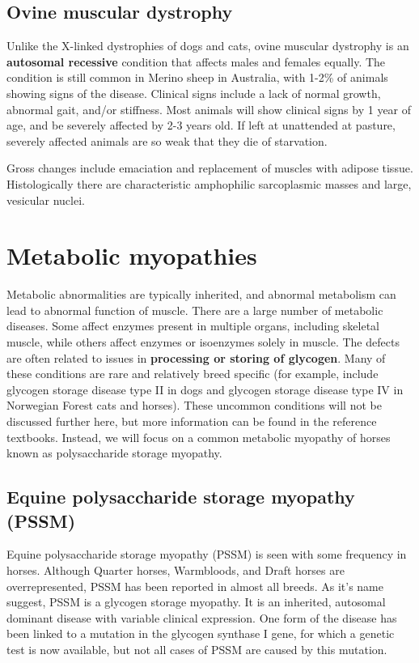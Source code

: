 \documentclass[openany]{report}
\begin{document}
\subsection{Ovine muscular dystrophy}\label{ovine-muscular-dystrophy}

Unlike the X-linked dystrophies of dogs and cats, ovine muscular
dystrophy is an \textbf{autosomal recessive} condition that affects
males and females equally. The condition is still common in Merino sheep
in Australia, with 1-2\% of animals showing signs of the disease.
Clinical signs include a lack of normal growth, abnormal gait, and/or
stiffness. Most animals will show clinical signs by 1 year of age, and
be severely affected by 2-3 years old. If left at unattended at pasture,
severely affected animals are so weak that they die of starvation.

Gross changes include emaciation and replacement of muscles with adipose
tissue. Histologically there are characteristic amphophilic sarcoplasmic
masses and large, vesicular nuclei.

\section{Metabolic myopathies}\label{metabolic-myopathies}

Metabolic abnormalities are typically inherited, and abnormal metabolism
can lead to abnormal function of muscle. There are a large number of
metabolic diseases. Some affect enzymes present in multiple organs,
including skeletal muscle, while others affect enzymes or isoenzymes
solely in muscle. The defects are often related to issues in
\textbf{processing or storing of glycogen}. Many of these conditions are
rare and relatively breed specific (for example, include glycogen
storage disease type II in dogs and glycogen storage disease type IV in
Norwegian Forest cats and horses). These uncommon conditions will not be
discussed further here, but more information can be found in the
reference textbooks. Instead, we will focus on a common metabolic
myopathy of horses known as polysaccharide storage myopathy.

\hypertarget{equine-polysaccharide-storage-myopathy-pssm}{\subsection{Equine
polysaccharide storage myopathy
(PSSM)}\label{equine-polysaccharide-storage-myopathy-pssm}}

Equine polysaccharide storage myopathy (PSSM) is seen with some
frequency in horses. Although Quarter horses, Warmbloods, and Draft
horses are overrepresented, PSSM has been reported in almost all breeds.
As it's name suggest, PSSM is a glycogen storage myopathy. It is an
inherited, autosomal dominant disease with variable clinical expression.
One form of the disease has been linked to a mutation in the glycogen
synthase I gene, for which a genetic test is now available, but not all
cases of PSSM are caused by this mutation.
\end{document}
